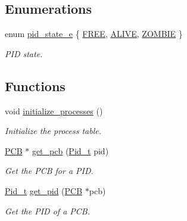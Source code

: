 \subsection*{Enumerations}
\begin{DoxyCompactItemize}
\item 
enum \hyperlink{group__proc_ga4f133ac5f9b2ca9c1446889baee1dc05}{pid\+\_\+state\+\_\+e} \{ \hyperlink{group__proc_gga4f133ac5f9b2ca9c1446889baee1dc05acc62d1576546f3245237e1b232d838b6}{F\+R\+EE}, 
\hyperlink{group__proc_gga4f133ac5f9b2ca9c1446889baee1dc05a4f34c5c191d6e0d028ca831b6c0b1571}{A\+L\+I\+VE}, 
\hyperlink{group__proc_gga4f133ac5f9b2ca9c1446889baee1dc05a5dfb36109b24f39d54d5c3f48f53def8}{Z\+O\+M\+B\+IE}
 \}\begin{DoxyCompactList}\small\item\em P\+ID state. \end{DoxyCompactList}
\end{DoxyCompactItemize}
\subsection*{Functions}
\begin{DoxyCompactItemize}
\item 
void \hyperlink{group__proc_ga82948cbeb57bb0b6e15d1f14f06a2db3}{initialize\+\_\+processes} ()
\begin{DoxyCompactList}\small\item\em Initialize the process table. \end{DoxyCompactList}\item 
\hyperlink{group__proc_ga91aaadf0c3f9cef2293a99c69795323f}{P\+CB} $\ast$ \hyperlink{group__proc_ga10cf45ea8bc92b00bd1f25553b9cf5c8}{get\+\_\+pcb} (\hyperlink{group__syscalls_gafac07f3170763932fac97b6eab2c3984}{Pid\+\_\+t} pid)
\begin{DoxyCompactList}\small\item\em Get the P\+CB for a P\+ID. \end{DoxyCompactList}\item 
\hyperlink{group__syscalls_gafac07f3170763932fac97b6eab2c3984}{Pid\+\_\+t} \hyperlink{group__proc_ga110e884cb053244b18d1058751a78cfe}{get\+\_\+pid} (\hyperlink{group__proc_ga91aaadf0c3f9cef2293a99c69795323f}{P\+CB} $\ast$pcb)
\begin{DoxyCompactList}\small\item\em Get the P\+ID of a P\+CB. \end{DoxyCompactList}\end{DoxyCompactItemize}


